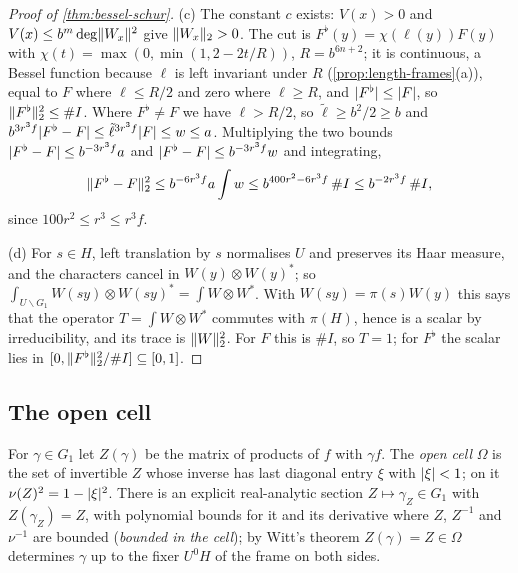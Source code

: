 \begin{proof}[Proof of \cref{thm:bessel-schur}]
(c) The constant $c$ exists: $V(x)>0$ and $V(x)\le b^m\deg\lVert W_x\rVert^2$ give $\lVert W_x\rVert_2>0$. The cut is $F^\flat(y)=\chi(\ell(y))F(y)$ with $\chi(t)=\max(0,\min(1,2-2t/R))$, $R=b^{6n+2}$; it is continuous, a Bessel function because $\ell$ is
left invariant under $R$ (\cref{prop:length-frames}(a)), equal to $F$ where $\ell\le R/2$ and zero where $\ell\ge R$, and $\lvert F^\flat\rvert\le\lvert F\rvert$, so $\lVert F^\flat\rVert_2^2\le\#I$. Where $F^\flat\ne F$ we have $\ell>R/2$, so $\tilde\ell\ge b^2/2\ge b$ and
$b^{3r^3f}\lvert F^\flat-F\rvert\le\tilde\ell^{3r^3f}\lvert F\rvert\le w\le a$. Multiplying the two bounds $\lvert F^\flat-F\rvert\le b^{-3r^3f}a$ and $\lvert F^\flat-F\rvert\le b^{-3r^3f}w$ and integrating,
\[
  \lVert F^\flat-F\rVert_2^2\le b^{-6r^3f}a\int w\le b^{400r^2-6r^3f}\,\#I\le b^{-2r^3f}\,\#I,
\]
since $100r^2\le r^3\le r^3f$.

(d) For $s\in H$, left translation by $s$ normalises $U$ and preserves its Haar measure, and the characters cancel in $W(y)\otimes W(y)^*$; so $\int_{U\backslash G_1}W(sy)\otimes W(sy)^*=\int W\otimes W^*$. With $W(sy)=\pi(s)W(y)$ this
says that the operator $T=\int W\otimes W^*$ commutes with $\pi(H)$, hence is a scalar by irreducibility, and its trace is $\lVert W\rVert_2^2$. For $F$ this is $\#I$, so $T=1$; for $F^\flat$ the scalar lies in $[0,\lVert F^\flat\rVert_2^2/\#I]\subseteq[0,1]$.
\end{proof}

\subsection{The open cell}\label{ss:open-cell}
For $\gamma\in G_1$ let $Z(\gamma)$ be the matrix of products of $f$ with $\gamma f$. The \emph{open cell} $\Omega$ is the set of invertible $Z$ whose inverse has last diagonal entry $\xi$
with $\lvert \xi\rvert<1$; on it $\nu(Z)^2=1-\lvert \xi\rvert^2$. There is an explicit real-analytic section $Z\mapsto\gamma_Z\in G_1$ with $Z(\gamma_Z)=Z$, with polynomial bounds for it and its
derivative where $Z$, $Z^{-1}$ and $\nu^{-1}$ are bounded (\emph{bounded in the cell}); by Witt's theorem $Z(\gamma)=Z\in\Omega$ determines $\gamma$ up to the fixer $U^0H$ of the frame on
both sides.


